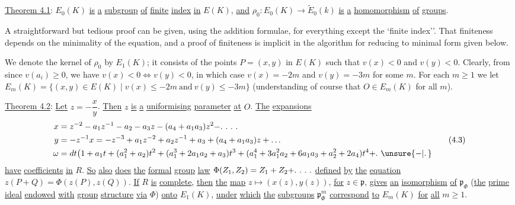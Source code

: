 \uline{Theorem 4.1}: $E_0(K)$ \uline{is} \uline{a} \uline{subgroup} \uline{of} \uline{finite} \uline{index} \uline{in} $E(K)$, \uline{and} $\rho_0:E_0(K)\to\widetilde E_0(k)$ \uline{is} \uline{a} \uline{homomorphism} \uline{of} \uline{groups}.

A straightforward but tedious proof can be given, using the addition formulae, for everything except the `finite index''. That finiteness depends on the minimality of the equation, and a proof of finiteness is implicit in the algorithm for reducing to minimal form given below.

We denote the kernel of $\rho_0$ by $E_1(K)$; it consists of the points $P=(x,y)$ in $E(K)$ such that $v(x)<0$ and $v(y)<0$. Clearly, from  since $v(a_i)\geqslant0$, we have $v(x)<0\Longleftrightarrow v(y)<0$, in which case $v(x)=-2m$ and $v(y)=-3m$ for some $m$. For each $m\geqslant1$ we let $E_m(K)=\{(x,y)\in E(K)\mid v(x)\leq-2m\ \text{and}\ v(y)\leq-3m\}$ (understanding of course that $O\in E_m(K)$ for all $m$).

\uline{Theorem 4.2}: \uline{Let} $z=-\dfrac{x}{y}$. \uline{Then} $z$ \uline{is} \uline{a} \uline{uniformising} \uline{parameter} \uline{at} $O$. \uline{The} \uline{expansions}
\begingroup\scriptsize
\[
\begin{aligned}
x&=z^{-2}-a_1z^{-1}-a_2-a_3z-(a_4+a_1a_3)z^2
 -\ldotp\,\ldotp\,\ldotp\,\ldotp\\
y&=-z^{-1}x=-z^{-3}+a_1z^{-2}+a_2z^{-1}+a_3+(a_4+a_1a_3)z+\ldots\\
\omega&=dt\bigl(1+a_1t+(a_1^2+a_2)t^2+(a_1^3+2a_1a_2+a_3)t^3+
 (a_1^4+3a_1^2a_2+6a_1a_3+a_2^2+2a_4)t^4+\ldotp\,\unsure{-|\ldotp}
\end{aligned}
\tag*{(4.3)}
\]
\endgroup
\uline{have} \uline{coefficients} \uline{in} $R$. \uline{So} \uline{also} \uline{does} \uline{the} \uline{formal}
\uline{group} \uline{law} $\Phi(Z_1,Z_2)=Z_1+Z_2+\ldotp\,\ldotp\,\ldotp\,\ldotp$ \uline{defined} \uline{by} \uline{the} \uline{equation} $z(P+Q)=\Phi(z(P),z(Q))$. \uline{If} $R$ \uline{is} \uline{complete}, \uline{then} \uline{the} \uline{map} $z\longmapsto(x(z),y(z))$, \uline{for} $z\in\mathfrak{p}$, \uline{gives} \uline{an} \uline{isomorphism} \uline{of} $\mathfrak{p}_{\Phi}$ (\uline{the} \uline{prime} \uline{ideal} \uline{endowed} \uline{with} \uline{group} \uline{structure} \uline{via} $\Phi$) \uline{onto} $E_1(K)$, \uline{under} \uline{which} \uline{the} \uline{subgroups} $\mathfrak{p}^m_{\Phi}$ \uline{correspond} \uline{to} $E_m(K)$ \uline{for} \uline{all} $m\geqslant1$.
\endgroup

